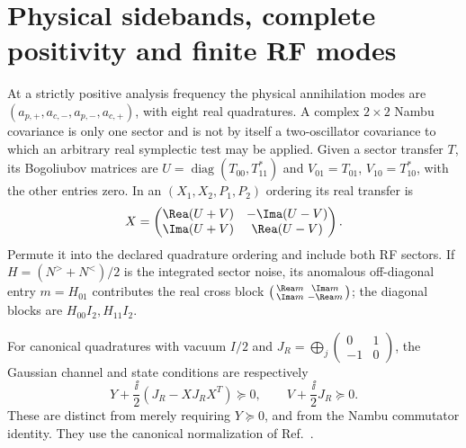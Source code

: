 \section{Physical sidebands, complete positivity and finite RF modes}
\label{sec:gc-sidebands}

At a strictly positive analysis frequency the physical annihilation modes are
$(a_{p,+},a_{c,-},a_{p,-},a_{c,+})$, with eight real quadratures. A complex
$2\times2$ Nambu covariance is only one sector and is not by itself a
two-oscillator covariance to which an arbitrary real symplectic test may be
applied. Given a sector transfer $T$, its Bogoliubov matrices are
$U=\operatorname{diag}(T_{00},T_{11}^*)$ and
$V_{01}=T_{01}$, $V_{10}=T_{10}^*$, with the other entries zero. In an
$(X_1,X_2,P_1,P_2)$ ordering its real transfer is
\begin{equation}
 X=\begin{pmatrix}
 \Rea(U+V)&-\Ima(U-V)\\
 \Ima(U+V)&\Rea(U-V)
 \end{pmatrix}.
 \label{eq:gc-bogoliubov-real}
\end{equation}
Permute it into the declared quadrature ordering and include both RF sectors.
If $H=(N^>+N^<)/2$ is the integrated sector noise, its anomalous off-diagonal
entry $m=H_{01}$ contributes the real cross block
$\left(\begin{smallmatrix}\Rea m&\Ima m\\\Ima m&-\Rea m\end{smallmatrix}\right)$;
the diagonal blocks are $H_{00}I_2,H_{11}I_2$.

For canonical quadratures with vacuum $I/2$ and
$J_R=\bigoplus_j\left(\begin{smallmatrix}0&1\\-1&0\end{smallmatrix}\right)$,
the Gaussian channel and state conditions are respectively
\begin{equation}
 Y+\frac{\ii}{2}(J_R-XJ_RX^T)\succeq0,
 \qquad V+\frac{\ii}{2}J_R\succeq0.
 \label{eq:gc-cp}
\end{equation}
These are distinct from merely requiring $Y\succeq0$, and from the Nambu
commutator identity. They use the canonical normalization of
Ref.~\cite{Weedbrook2012}.

